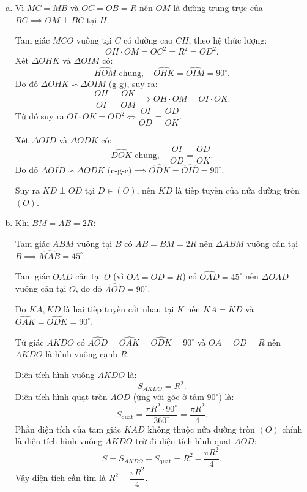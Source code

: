 \begin{bt}
{\begin{enumerate}[a)]
			Tứ giác $MCOB$ có $\widehat{MCO} + \widehat{MBO} = 90^\circ + 90^\circ = 180^\circ$, suy ra $MCOB$ nội tiếp đường tròn đường kính $MO$.
			
			Vì $I$ là trung điểm của dây cung $AD$ nên $OI \perp AD \implies \widehat{MIO} = 90^\circ$.
			
			Tứ giác $MCIO$ có $\widehat{MCO} = \widehat{MIO} = 90^\circ$, do đó $C$ và $I$ cùng nhìn đoạn $MO$ dưới góc vuông.
			
			Suy ra $MCIO$ nội tiếp đường tròn đường kính $MO$.
			\item Vì $MC = MB$ và $OC = OB = R$ nên $OM$ là đường trung trực của $BC \implies OM \perp BC$ tại $H$.
			
			Tam giác $MCO$ vuông tại $C$ có đường cao $CH$, theo hệ thức lượng:
			$$OH \cdot OM = OC^2 = R^2 = OD^2.$$
			Xét $\Delta OHK$ và $\Delta OIM$ có:
			$$\widehat{HOM}\text{ chung},\quad \widehat{OHK} = \widehat{OIM} = 90^\circ.$$
			Do đó $\Delta OHK \backsim \Delta OIM\text{ (g-g)}$, suy ra:
			$$\dfrac{OH}{OI} = \dfrac{OK}{OM} \implies OH \cdot OM = OI \cdot OK.$$
			Từ đó suy ra $OI \cdot OK = OD^2 \iff \dfrac{OI}{OD} = \dfrac{OD}{OK}$.
			
			Xét $\Delta OID$ và $\Delta ODK$ có:
			$$\widehat{DOK}\text{ chung},\quad \dfrac{OI}{OD} = \dfrac{OD}{OK}.$$
			Do đó $\Delta OID \backsim \Delta ODK\text{ (c-g-c)} \implies \widehat{ODK} = \widehat{OID} = 90^\circ$.
			
			Suy ra $KD \perp OD$ tại $D \in (O)$, nên $KD$ là tiếp tuyến của nửa đường tròn $(O)$.
			\item Khi $BM = AB = 2R$:
			
			Tam giác $ABM$ vuông tại $B$ có $AB = BM = 2R$ nên $\Delta ABM$ vuông cân tại $B \implies \widehat{MAB} = 45^\circ$.
			
			Tam giác $OAD$ cân tại $O$ (vì $OA = OD = R$) có $\widehat{OAD} = 45^\circ$ nên $\Delta OAD$ vuông cân tại $O$, do đó $\widehat{AOD} = 90^\circ$.
			
			Do $KA, KD$ là hai tiếp tuyến cắt nhau tại $K$ nên $KA = KD$ và $\widehat{OAK} = \widehat{ODK} = 90^\circ$.
			
			Tứ giác $AKDO$ có $\widehat{AOD} = \widehat{OAK} = \widehat{ODK} = 90^\circ$ và $OA = OD = R$ nên $AKDO$ là hình vuông cạnh $R$.
			
			Diện tích hình vuông $AKDO$ là:
			$$S_{AKDO} = R^2.$$
			Diện tích hình quạt tròn $AOD$ (ứng với góc ở tâm $90^\circ$) là:
			$$S_{\text{quạt}} = \dfrac{\pi R^2 \cdot 90^\circ}{360^\circ} = \dfrac{\pi R^2}{4}.$$
			Phần diện tích của tam giác $KAD$ không thuộc nửa đường tròn $(O)$ chính là diện tích hình vuông $AKDO$ trừ đi diện tích hình quạt $AOD$:
			$$S = S_{AKDO} - S_{\text{quạt}} = R^2 - \dfrac{\pi R^2}{4}.$$
			Vậy diện tích cần tìm là $R^2 - \dfrac{\pi R^2}{4}$.
		\end{enumerate}
	}
\end{bt}

